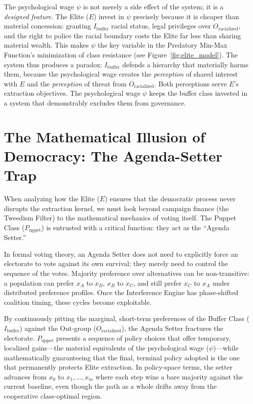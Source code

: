 \documentclass[12pt,openany]{book}
\begin{document}
The psychological wage $\psi$ is not merely a side effect of the system; it is a \textit{designed feature}. The Elite ($E$) invest in $\psi$ precisely because it is cheaper than material concession: granting $I_{\text{buffer}}$ racial status, legal privileges over $O_{\text{racialized}}$, and the right to police the racial boundary costs the Elite far less than sharing material wealth. This makes $\psi$ the key variable in the Predatory Min-Max Function's minimization of class resistance (see Figure~\ref{fig:elite_model}). The system thus produces a paradox: $I_{\text{buffer}}$ defends a hierarchy that materially harms them, because the psychological wage creates the \textit{perception} of shared interest with $E$ and the \textit{perception} of threat from $O_{\text{racialized}}$. Both perceptions serve $E$'s extraction objectives. The psychological wage $\psi$ keeps the buffer class invested in a system that demonstrably excludes them from governance.
\section{The Mathematical Illusion of Democracy: The Agenda-Setter Trap}

When analyzing how the Elite ($E$) ensures that the democratic process never disrupts the extraction kernel, we must look beyond campaign finance (the Tweedism Filter) to the mathematical mechanics of voting itself. The Puppet Class ($P_{\text{uppet}}$) is entrusted with a critical function: they act as the ``Agenda Setter.''

In formal voting theory, an Agenda Setter does not need to explicitly force an electorate to vote against its own survival; they merely need to control the sequence of the votes. Majority preference over alternatives can be non-transitive: a population can prefer $x_A$ to $x_B$, $x_B$ to $x_C$, and still prefer $x_C$ to $x_A$ under distributed preference profiles. Once the Interference Engine has phase-shifted coalition timing, these cycles become exploitable.

By continuously pitting the marginal, short-term preferences of the Buffer Class ($I_{\text{buffer}}$) against the Out-group ($O_{\text{racialized}}$), the Agenda Setter fractures the electorate. $P_{\text{uppet}}$ presents a sequence of policy choices that offer temporary, localized gains---the material equivalents of the psychological wage ($\psi$)---while mathematically guaranteeing that the final, terminal policy adopted is the one that permanently protects Elite extraction. In policy-space terms, the setter advances from $x_0$ to $x_1,\ldots,x_m$ where each step wins a bare majority against the current baseline, even though the path as a whole drifts away from the cooperative class-optimal region.
\end{document}
